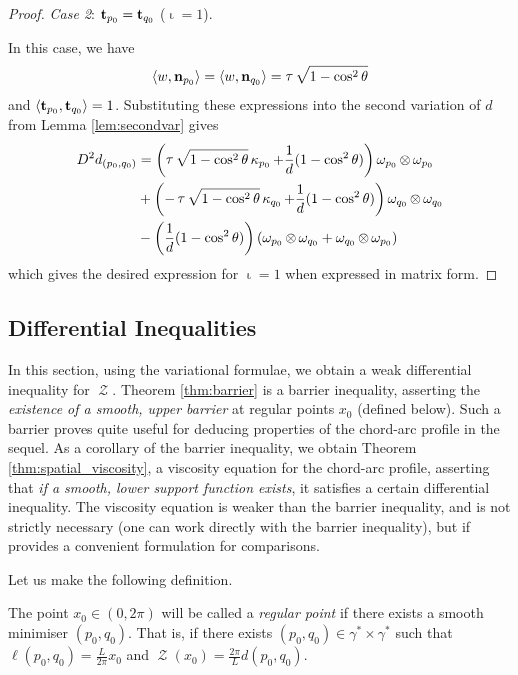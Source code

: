 \documentclass[11pt]{amsart}
\DeclareMathOperator{\chordarcprofile}{\mathcal{Z}}
\DeclareMathOperator{\tangindicator}{\iota}
\DeclareMathOperator{\norindicator}{\tau}
\begin{document}
\begin{proof}
\emph{Case 2}: $\operatorname{\mathbf{t}}_{p_0} = \operatorname{\mathbf{t}}_{q_0}$ ($\tangindicator = 1$).

In this case, we have 
\[
\ip{w}{\nor_{p_0}} = \ip{w}{\nor_{q_0}} = \norindicator \sqrt{1-\cos^2\theta}
\]
and $\langle{\operatorname{\mathbf{t}}_{p_0}},{\operatorname{\mathbf{t}}_{q_0}}\rangle = 1$. Substituting these expressions into the second variation of $d$  from Lemma \ref{lem:secondvar} gives
\begin{align*}
D^2d_{(p_0,q_0)} &=  \left(\norindicator \sqrt{1-\cos^2\theta}\curvecurv_{p_0} + \frac{1}{d}(1 - \cos^2\theta) \right) \omega_{p_0} \tensor \omega_{p_0} \\
&+ \left(-\norindicator \sqrt{1-\cos^2\theta} \curvecurv_{q_0} + \frac{1}{d}(1 - \cos^2\theta) \right) \omega_{q_0} \tensor \omega_{q_0} \\
&- \left(\frac{1}{d}(1 - \cos^2\theta) \right) \left(\omega_{p_0} \tensor \omega_{q_0} + \omega_{q_0} \tensor \omega_{p_0} \right)
\end{align*}
which gives the desired expression for $\tangindicator=1$ when expressed in matrix form.
\end{proof}

\subsection{Differential Inequalities}
\label{sec:orgheadline9}

In this section, using the variational formulae, we obtain a weak differential inequality for \(\chordarcprofile\). Theorem \ref{thm:barrier} is a barrier inequality, asserting the \emph{existence of a smooth, upper barrier} at regular points \(x_0\) (defined below). Such a barrier proves quite useful for deducing properties of the chord-arc profile in the sequel. As a corollary of the barrier inequality, we obtain Theorem \ref{thm:spatial_viscosity}, a viscosity equation for the chord-arc profile, asserting that \emph{if a smooth, lower support function exists}, it satisfies a certain differential inequality. The viscosity equation is weaker than the barrier inequality, and is not strictly necessary (one can work directly with the barrier inequality), but if provides a convenient formulation for comparisons.

Let us make the following definition.
\begin{defn}
The point \(x_0 \in (0, 2\pi)\) will be called a \emph{regular point} if there exists a smooth minimiser \((p_0, q_0)\). That is, if there exists \((p_0, q_0) \in \gamma^{\ast} \times \gamma^{\ast}\) such that \(\ell(p_0, q_0) = \tfrac{L}{2\pi} x_0\) and \(\chordarcprofile(x_0) = \tfrac{2\pi}{L} d(p_0, q_0)\).
\end{defn}
\end{document}
